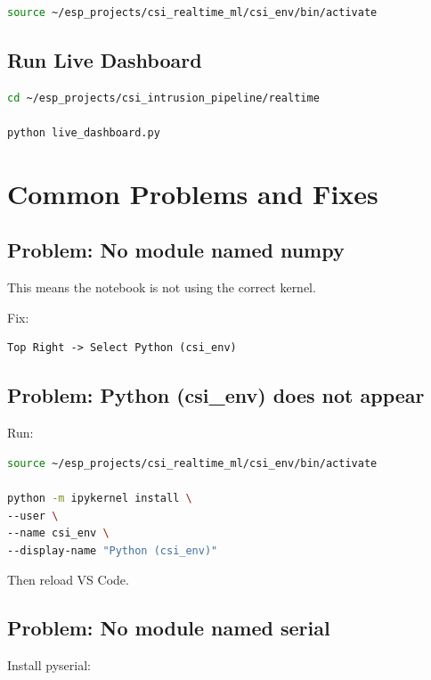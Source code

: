 \documentclass[12pt,a4paper]{article}
\begin{document}
\begin{lstlisting}[language=bash]
source ~/esp_projects/csi_realtime_ml/csi_env/bin/activate
\end{lstlisting}

\subsection{Run Live Dashboard}

\begin{lstlisting}[language=bash]
cd ~/esp_projects/csi_intrusion_pipeline/realtime

python live_dashboard.py
\end{lstlisting}

\section{Common Problems and Fixes}

\subsection{Problem: No module named numpy}

This means the notebook is not using the correct kernel.

Fix:

\begin{verbatim}
Top Right -> Select Python (csi_env)
\end{verbatim}

\subsection{Problem: Python (csi\_env) does not appear}

Run:

\begin{lstlisting}[language=bash]
source ~/esp_projects/csi_realtime_ml/csi_env/bin/activate

python -m ipykernel install \
--user \
--name csi_env \
--display-name "Python (csi_env)"
\end{lstlisting}

Then reload VS Code.

\subsection{Problem: No module named serial}

Install pyserial:
\end{document}
